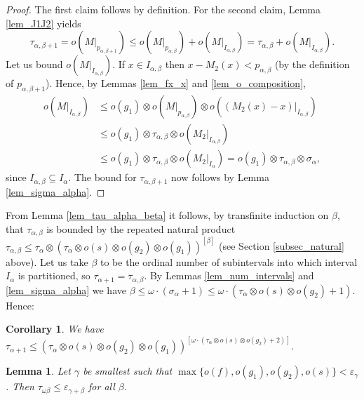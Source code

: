 \documentclass{article}
\newtheorem{Lemma}[Theorem]{Lemma}
\newtheorem{Corollary}[Theorem]{Corollary}
\theoremstyle{definition}
\begin{document}
\begin{proof}
    The first claim follows by definition. For the second claim, Lemma \ref{lem_J1J2} yields
    \begin{equation*}
        \tau_{\alpha,\beta+1}=o(M|_{p_{\alpha,\beta+1}}) \le o(M|_{p_{\alpha,\beta}})+o(M|_{I_{\alpha,\beta}})=\tau_{\alpha,\beta}+o(M|_{I_{\alpha,\beta}}).
    \end{equation*}
    Let us bound $o(M|_{I_{\alpha,\beta}})$. If $x\in I_{\alpha,\beta}$ then $x-M_2(x)<p_{\alpha,\beta}$ (by the definition of $p_{\alpha,\beta+1}$). Hence, by Lemmas \ref{lem_fx_x} and \ref{lem_o_composition},
    \begin{align*}
        o(M|_{I_{\alpha,\beta}})&\le o(g_1)\otimes o(M|_{p_{\alpha,\beta}})\otimes o((M_2(x)-x)|_{I_{\alpha,\beta}})\\
        &\le o(g_1)\otimes \tau_{\alpha,\beta}\otimes o(M_2|_{I_{\alpha,\beta}})\\
        &\le o(g_1)\otimes\tau_{\alpha,\beta}\otimes o(M_2|_{I_\alpha})=o(g_1)\otimes\tau_{\alpha,\beta}\otimes\sigma_\alpha,
    \end{align*}
    since $I_{\alpha,\beta}\subseteq I_\alpha$. The bound for $\tau_{\alpha,\beta+1}$ now follows by Lemma \ref{lem_sigma_alpha}.
\end{proof}

From Lemma \ref{lem_tau_alpha_beta} it follows, by transfinite induction on $\beta$, that $\tau_{\alpha,\beta}$ is bounded by the repeated natural product $\tau_{\alpha,\beta}\le \tau_\alpha \otimes (\tau_\alpha\otimes o(s)\otimes o(g_2)\otimes o(g_1))^{[\beta]}$ (see Section \ref{subsec_natural} above). Let us take $\beta$ to be the ordinal number of subintervals into which interval $I_\alpha$ is partitioned, so $\tau_{\alpha+1}=\tau_{\alpha,\beta}$. By Lemmas \ref{lem_num_intervals} and \ref{lem_sigma_alpha} we have $\beta\le \omega\cdot(\sigma_\alpha+1)\le \omega\cdot(\tau_\alpha\otimes o(s)\otimes o(g_2)+1)$. Hence:
\begin{Corollary}\label{cor_tau_ap1}
    We have $\tau_{\alpha+1} \le (\tau_\alpha\otimes o(s)\otimes o(g_2)\otimes o(g_1))^{[\omega\cdot(\tau_\alpha\otimes o(s)\otimes o(g_2)+2)]}$.
\end{Corollary}

\begin{Lemma}\label{lem_tau_omega_beta}
    Let $\gamma$ be smallest such that $\max{\{o(f),o(g_1), o(g_2), o(s)\}} < \varepsilon_\gamma$. Then $\tau_{\omega\beta}\le\varepsilon_{\gamma+\beta}$ for all $\beta$.
\end{Lemma}
\end{document}
